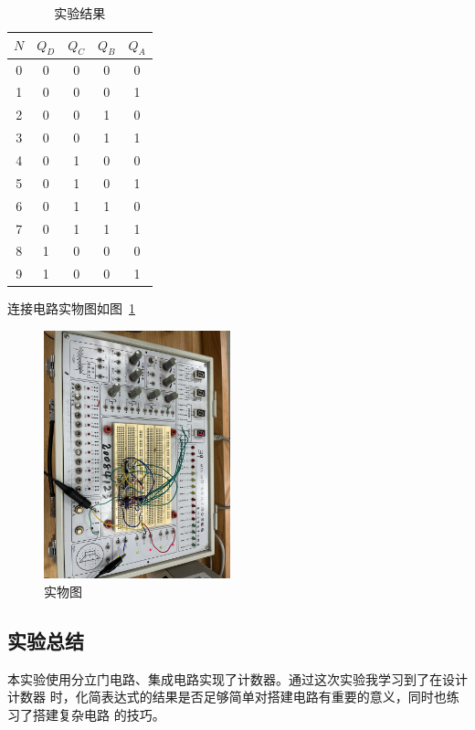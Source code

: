 \documentclass[a4paper,twoside]{ctexart}
\begin{document}
\begin{spacing}{1.2}
\begin{table}[htbp]
	\centering
	\caption{实验结果}
	\label{tbl:res64}
	\begin{tabular}{c|cccc}
		\toprule
		\hline
		$N$&$Q_D$&$Q_C$&$Q_B$&$Q_A$ \\
		\hline
		0&0&0&0&0 \\
		1&0&0&0&1 \\
		2&0&0&1&0 \\
		3&0&0&1&1 \\
		4&0&1&0&0 \\
		5&0&1&0&1 \\
		6&0&1&1&0 \\
		7&0&1&1&1 \\
		8&1&0&0&0 \\
		9&1&0&0&1 \\
		\hline
		\bottomrule
	\end{tabular}
\end{table}

连接电路实物图如图~\ref{fig:res63}

\begin{figure}[htbp]
	\centering
	\caption{实物图}
	\label{fig:res63}
	\includegraphics[width=0.48\textwidth,angle=90]{63.jpg}
\end{figure}

\subsection{实验总结}

本实验使用分立门电路、集成电路实现了计数器。通过这次实验我学习到了在设计计数器
时，化简表达式的结果是否足够简单对搭建电路有重要的意义，同时也练习了搭建复杂电路
的技巧。

\end{spacing}
\end{document}
